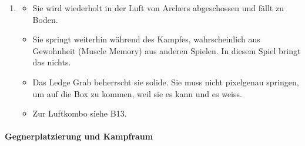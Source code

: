 \documentclass[../Main.tex]{subfiles}
\begin{document}
\begin{enumerate}[label=\textbf{B\arabic*}, leftmargin=1.5cm, itemsep=0.8em]
\item
    \begin{itemize}[nosep]
        \item Sie wird wiederholt in der Luft von Archers abgeschossen und fällt zu Boden.
        \item Sie springt weiterhin während des Kampfes, wahrscheinlich aus Gewohnheit (Muscle Memory) aus anderen Spielen. In diesem Spiel bringt das nichts.
        \item Das Ledge Grab beherrscht sie solide. Sie muss nicht pixelgenau springen, um auf die Box zu kommen, weil sie es kann und es weiss.
        \item Zur Luftkombo siehe B13.
    \end{itemize}
\end{enumerate}

\paragraph{Gegnerplatzierung und Kampfraum}
\end{document}
